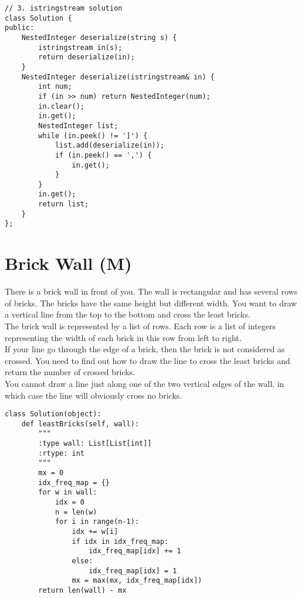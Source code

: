 \begin{lstlisting}
// 3. istringstream solution
class Solution {
public:
    NestedInteger deserialize(string s) {
        istringstream in(s);
        return deserialize(in);
    }
    NestedInteger deserialize(istringstream& in) {
        int num;
        if (in >> num) return NestedInteger(num);
        in.clear();
        in.get();
        NestedInteger list;
        while (in.peek() != ']') {
            list.add(deserialize(in));
            if (in.peek() == ',') {
                in.get();
            }
        }
        in.get();
        return list;
    }
};
\end{lstlisting}

\section{Brick Wall (M)}
There is a brick wall in front of you. The wall is rectangular and has several rows of bricks. The bricks have the same height but different width. You want to draw a vertical line from the top to the bottom and cross the least bricks.\\

The brick wall is represented by a list of rows. Each row is a list of integers representing the width of each brick in this row from left to right.\\

If your line go through the edge of a brick, then the brick is not considered as crossed. You need to find out how to draw the line to cross the least bricks and return the number of crossed bricks.\\

You cannot draw a line just along one of the two vertical edges of the wall, in which case the line will obviously cross no bricks. \\

\begin{lstlisting}
class Solution(object):
    def leastBricks(self, wall):
        """
        :type wall: List[List[int]]
        :rtype: int
        """
        mx = 0
        idx_freq_map = {}
        for w in wall:
            idx = 0
            n = len(w)
            for i in range(n-1):
                idx += w[i]
                if idx in idx_freq_map:
                    idx_freq_map[idx] += 1
                else:
                    idx_freq_map[idx] = 1
                mx = max(mx, idx_freq_map[idx])
        return len(wall) - mx        
\end{lstlisting}
        
